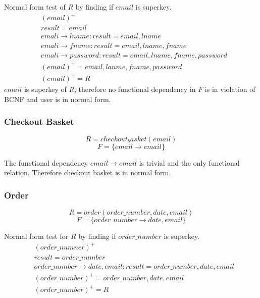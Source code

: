 \documentclass[fleqn]{scrreprt}
\begin{document}
Normal form test of $R$ by finding if $email$ is superkey.
\begin{align*}
    & (email)^+\\
    & result = email\\
    & emali \rightarrow lname : result = email, lname\\
    & emali \rightarrow fname : result = email, lname, fname\\
    & emali \rightarrow password : result = email, lname, fname, password\\
    & (email)^+ = email, lanme, fname, password\\
    & (email)^+ = R
\end{align*}
$email$ is superkey of $R$, therefore no functional dependency in $F$ is in
violation of BCNF and user is in normal form.

\subsubsection{Checkout Basket}
\begin{equation*}
    R = checkout_basket(email)
\end{equation*}
\begin{equation*}
    F = \{email \rightarrow email\}
\end{equation*}

The functional dependency $email \rightarrow email$ is trivial and the only
functional relation. Therefore checkout basket is in normal form.

\subsubsection{Order}
\begin{equation*}
    R = order(order\_number, date, email)
\end{equation*}
\begin{equation*}
    F = \{ order\_number \rightarrow date, email \}
\end{equation*}

Normal form test for $R$ by finding if $order\_number$ is superkey.
\begin{align*}
    & (order\_numner)^+\\
    & result = order\_number\\
    & order\_number \rightarrow date, email : result = order\_number, date, email\\
    & (order\_number)^+ = order\_number, date, email\\
    & (order\_number)^+ = R
\end{align*}
\end{document}
